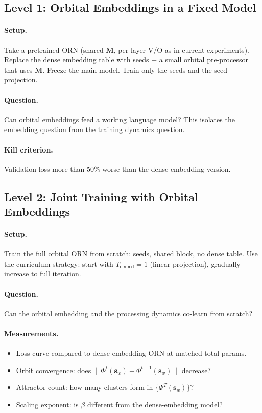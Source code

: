 \documentclass[11pt, a4paper]{article}
\newcommand{\M}{\mathbf{M}}
\newcommand{\s}{\mathbf{s}}
\theoremstyle{remark}
\begin{document}
\subsection{Level 1: Orbital Embeddings in a Fixed Model}

\paragraph{Setup.}
Take a pretrained ORN (shared $\M$, per-layer V/O as in current experiments).
Replace the dense embedding table with seeds + a small orbital pre-processor that uses $\M$.
Freeze the main model.
Train only the seeds and the seed projection.

\paragraph{Question.}
Can orbital embeddings feed a working language model?
This isolates the embedding question from the training dynamics question.

\paragraph{Kill criterion.}
Validation loss more than $50\%$ worse than the dense embedding version.

\subsection{Level 2: Joint Training with Orbital Embeddings}

\paragraph{Setup.}
Train the full orbital ORN from scratch: seeds, shared block, no dense table.
Use the curriculum strategy: start with $T_{\text{embed}} = 1$ (linear projection), gradually increase to full iteration.

\paragraph{Question.}
Can the orbital embedding and the processing dynamics co-learn from scratch?

\paragraph{Measurements.}
\begin{itemize}[nosep]
    \item Loss curve compared to dense-embedding ORN at matched total params.
    \item Orbit convergence: does $\|\Phi^t(\s_w) - \Phi^{t-1}(\s_w)\|$ decrease?
    \item Attractor count: how many clusters form in $\{\Phi^T(\s_w)\}$?
    \item Scaling exponent: is $\beta$ different from the dense-embedding model?
\end{itemize}
\end{document}
